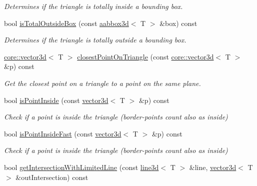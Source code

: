 \begin{DoxyCompactItemize}
\begin{DoxyCompactList}\small\item\em Determines if the triangle is totally inside a bounding box. \end{DoxyCompactList}\item 
bool \hyperlink{classirr_1_1core_1_1triangle3d_ac191abc19290c4a7fcad9af3a5707bc1}{is\+Total\+Outside\+Box} (const \hyperlink{classirr_1_1core_1_1aabbox3d}{aabbox3d}$<$ T $>$ \&box) const
\begin{DoxyCompactList}\small\item\em Determines if the triangle is totally outside a bounding box. \end{DoxyCompactList}\item 
\hyperlink{classirr_1_1core_1_1vector3d}{core\+::vector3d}$<$ T $>$ \hyperlink{classirr_1_1core_1_1triangle3d_a0212c09e6804a7a25c3fef791b6b1336}{closest\+Point\+On\+Triangle} (const \hyperlink{classirr_1_1core_1_1vector3d}{core\+::vector3d}$<$ T $>$ \&p) const
\begin{DoxyCompactList}\small\item\em Get the closest point on a triangle to a point on the same plane. \end{DoxyCompactList}\item 
\mbox{\label{classirr_1_1core_1_1triangle3d_abd425100f688516bdd701135cc980f18}} 
bool \hyperlink{classirr_1_1core_1_1triangle3d_abd425100f688516bdd701135cc980f18}{is\+Point\+Inside} (const \hyperlink{classirr_1_1core_1_1vector3d}{vector3d}$<$ T $>$ \&p) const
\begin{DoxyCompactList}\small\item\em Check if a point is inside the triangle (border-\/points count also as inside) \end{DoxyCompactList}\item 
bool \hyperlink{classirr_1_1core_1_1triangle3d_a87d93ff616faf4b99b59f8d2ecd9c0de}{is\+Point\+Inside\+Fast} (const \hyperlink{classirr_1_1core_1_1vector3d}{vector3d}$<$ T $>$ \&p) const
\begin{DoxyCompactList}\small\item\em Check if a point is inside the triangle (border-\/points count also as inside) \end{DoxyCompactList}\item 
bool \hyperlink{classirr_1_1core_1_1triangle3d_a3274d1e1ee1d28050176736c5e6773c2}{get\+Intersection\+With\+Limited\+Line} (const \hyperlink{classirr_1_1core_1_1line3d}{line3d}$<$ T $>$ \&line, \hyperlink{classirr_1_1core_1_1vector3d}{vector3d}$<$ T $>$ \&out\+Intersection) const

\end{DoxyCompactItemize}
